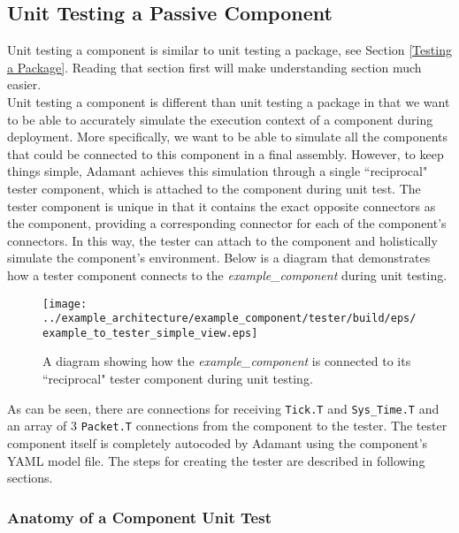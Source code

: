 \subsection{Unit Testing a Passive Component} \label{Component Unit Testing}

Unit testing a component is similar to unit testing a package, see Section \ref{Testing a Package}. Reading that section first will make understanding section much easier. \\

Unit testing a component is different than unit testing a package in that we want to be able to accurately simulate the execution context of a component during deployment. More specifically, we want to be able to simulate all the components that could be connected to this component in a final assembly. However, to keep things simple, Adamant achieves this simulation through a single ``reciprocal" tester component, which is attached to the component during unit test. The tester component is unique in that it contains the exact opposite connectors as the component, providing a corresponding connector for each of the component's connectors. In this way, the tester can attach to the component and holistically simulate the component's environment. Below is a diagram that demonstrates how a tester component connects to the \textit{example\_component} during unit testing.

\begin{figure}[H]
  \texttt{[image: ../example\_architecture/example\_component/tester/build/eps/example\_to\_tester\_simple\_view.eps]}
  \caption{A diagram showing how the \textit{example\_component} is connected to its ``reciprocal" tester component during unit testing.}
\end{figure}

As can be seen, there are connections for receiving \texttt{Tick.T} and \texttt{Sys\_Time.T} and an array of 3 \texttt{Packet.T} connections from the component to the tester. The tester component itself is completely autocoded by Adamant using the component's YAML model file. The steps for creating the tester are described in following sections. \\

\subsubsection{Anatomy of a Component Unit Test} \label{Anatomy of a Component Unit Test}

